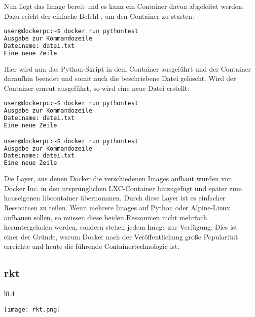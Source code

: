 Nun liegt das Image bereit und es kann ein Container davon abgeleitet werden. Dazu reicht der einfache Befehl , um den Container zu starten:

\begin{lstlisting}[language=bash,caption={Terminalausgabe docker run},label={code:dockerbuild}]
user@dockerpc:~$ docker run pythontest
Ausgabe zur Kommandozeile
Dateiname: datei.txt
Eine neue Zeile
\end{lstlisting}

Hier wird nun das Python-Skript in dem Container ausgeführt und der Container daraufhin beendet und somit auch die beschriebene Datei gelöscht. Wird der Container erneut ausgeführt, so wird eine neue Datei erstellt:

\begin{lstlisting}[language=bash,caption={Terminalausgabe docker run mehrfach},label={code:dockerbuild}]
user@dockerpc:~$ docker run pythontest
Ausgabe zur Kommandozeile
Dateiname: datei.txt
Eine neue Zeile

user@dockerpc:~$ docker run pythontest
Ausgabe zur Kommandozeile
Dateiname: datei.txt
Eine neue Zeile
\end{lstlisting}

Die Layer, aus denen Docker die verschiedenen Images aufbaut wurden von Docker Inc. in den ursprünglichen \ac{LXC}-Container hinzugefügt und später zum hauseigenen libcontainer übernommen. Durch diese Layer ist es einfacher Ressourcen zu teilen. Wenn mehrere Images auf Python oder Alpine-Linux aufbauen sollen, so müssen diese beiden Ressourcen nicht mehrfach heruntergeladen werden, sondern stehen jedem Image zur Verfügung. Dies ist einer der Gründe, warum Docker nach der Veröffentlichung große Popularität erreichte und heute die führende Containertechnologie ist.\cite{dockermilestones}



\subsection*{rkt}
\label{sec:rkt}

\begin{wrapfigure}{l}{0.4\textwidth}
	\vspace{-40pt}
	\begin{center}
		\texttt{[image: rkt.png]}
	\end{center}
	\vspace{-15pt}
	\caption[Logo rkt]{ \footnotemark}
	\label{fig:rkt}
	\vspace{-30pt}
\end{wrapfigure}


